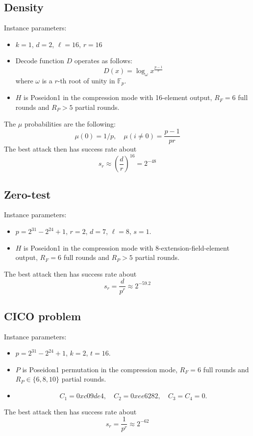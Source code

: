 \documentclass{article}
\begin{document}
\subsection{Density}

Instance parameters:
\begin{itemize}
    \item $k=1$, $d=2$, $\ell=16$, $r=16$
    \item $\mathrm{Decode}$ function $D$ operates as follows:
    $$
    D(x)=\log_{\omega} x^{\frac{p-1}{r}}
    $$
    where $\omega$ is a $r$-th root of unity in $\mathbb{F}_p$.
    \item $H$ is Poseidon1 in the compression mode with  16-element output, $R_F=6$ full rounds and $R_P>5$ partial rounds.
\end{itemize}

The $\mu$ probabilities are the following:
$$
\mu(0)=1/p,\quad \mu(i\neq 0) = \frac{p-1}{pr}
$$
The best attack then has success rate about
$$
s_r\approx \left(\frac{d}{r}\right)^{16}=2^{-48}
$$

\subsection{Zero-test}

Instance parameters:
\begin{itemize}
    \item $p=2^{31}-2^{24}+1$, $r=2$, $d=7$, $\ell=8$, $s=1$.
    \item $H$ is Poseidon1 in the compression mode with  8-extension-field-element output, $R_F=6$ full rounds and $R_P>5$ partial rounds.
\end{itemize}
The best attack then has success rate about
$$
s_r= \frac{d}{p^r}\approx 2^{-59.2}
$$


\subsection{CICO problem}
Instance parameters:
\begin{itemize}
    \item $p=2^{31}-2^{24}+1$, $k=2$, $t=16$.
    \item $P$ is Poseidon1 permutation in the compression mode,
     $R_F=6$ full rounds and $R_P\in\{6,8,10\}$ partial rounds.
     \item
     $$
     C_1=0xc09de4,\quad C_2=0xee6282,\quad C_3=C_4 = 0.
     $$
\end{itemize}
The best attack then has success rate about
$$
s_r= \frac{1}{p^r}\approx 2^{-62}
$$
\end{document}
